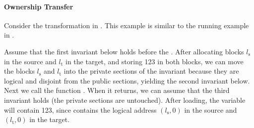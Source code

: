\paragraph{Ownership Transfer}

Consider the transformation in .  This
example is similar to the running example in
.

Assume that the first invariant below holds before the .  After
allocating blocks $l_\text{s}$ in the source and $l_\text{t}$ in
the target, and storing 123 in both blocks, we can move the blocks $l_\text{s}$
and $l_\text{t}$ into the private sections of the invariant because they are logical and disjoint from the
public sections, yielding the second invariant below. Next we call the function . When it
returns, we can assume that the third invariant holds (\ie the
private sections are untouched). After loading, the variable
 will contain 123, since  contains the
logical address $(l_\text{s},0)$ in the source and $(l_\text{t},0)$ in
the target. 

